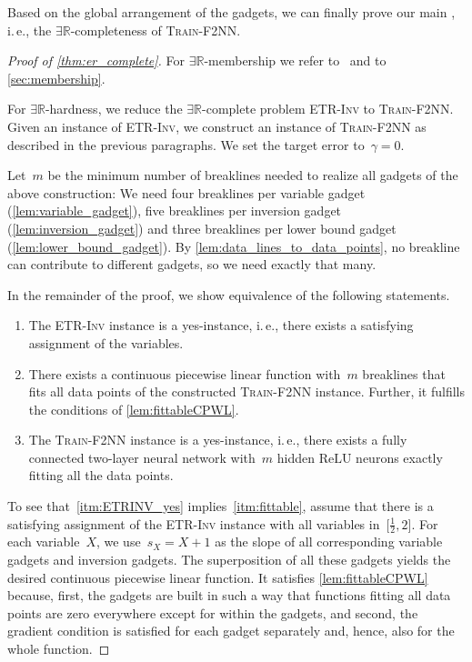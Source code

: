\documentclass[11pt]{article}
\numberwithin{equation}{section}
\theoremstyle{definition}
\theoremstyle{plain}
\newcommand{\R}{\mathbb R}
\newcommand{\ie}{i.\,e.}
\newcommand{\ER}{\texorpdfstring{\ensuremath{\exists\R}}{ER}\xspace}
\newcommand{\problemname}[1]{\textnormal{\textsc{#1}}\xspace}
\newcommand{\trainNN}{\problemname{Train-F2NN}}
\newcommand{\ETRINV}{\problemname{ETR-Inv}}
\newcommand{\fullyconnected}{fully connected\xspace}
\newcommand{\twolayer}{two-layer\xspace}
\newcommand{\ReLU}{\ensuremath{\mathrm{ReLU}}\xspace}
\newcommand{\CPWL}{continuous piecewise linear\xspace}
\theoremstyle{plain}
\begin{document}
Based on the global arrangement of the gadgets, we can finally prove our main , \ie, the \ER-completeness of \trainNN.

\begin{proof}[Proof of \cref{thm:er_complete}]
    For \ER-membership we refer to~\cite{Abrahamsen2021_NeuralNetworks} and to \cref{sec:membership}.
    
    For \ER-hardness, we reduce the \ER-complete problem \ETRINV to \trainNN.
    Given an instance of \ETRINV, we construct an instance of \trainNN as described in the previous paragraphs.
    We set the target error to~$\gamma = 0$.

    Let~$m$ be the minimum number of breaklines needed to realize all gadgets of the above construction:
    We need four breaklines per variable gadget (\cref{lem:variable_gadget}), five breaklines per inversion gadget (\cref{lem:inversion_gadget}) and three breaklines per lower bound gadget (\cref{lem:lower_bound_gadget}).
    By \cref{lem:data_lines_to_data_points}, no breakline can contribute to different gadgets, so we need exactly that many.

    In the remainder of the proof, we show equivalence of the following statements.
    \begin{enumerate}[label=(\arabic*)]
        \item\label{itm:ETRINV_yes}
        The \ETRINV instance is a yes-instance, \ie, there exists a satisfying assignment of the variables.

        \item\label{itm:fittable}
        There exists a \CPWL function with~$m$ breaklines that fits all data points of the constructed \trainNN instance.
        Further, it fulfills the conditions of \cref{lem:fittableCPWL}.

        \item\label{itm:trainNN_yes}
        The \trainNN instance is a yes-instance, \ie, there exists a \fullyconnected \twolayer neural network with~$m$ hidden \ReLU neurons exactly fitting all the data points.
    \end{enumerate}

    To see that~\ref{itm:ETRINV_yes} implies~\ref{itm:fittable}, assume that there is a satisfying assignment of the \ETRINV instance with all variables in~$\bigl[\frac{1}{2}, 2\bigr]$.
    For each variable~$X$, we use~$s_X = X + 1$ as the slope of all corresponding variable gadgets and inversion gadgets.
    The superposition of all these gadgets yields the desired \CPWL function.
    It satisfies \cref{lem:fittableCPWL} because, first, the gadgets are built in such a way that functions fitting all data points are %
zero everywhere except for within the gadgets, and second, the gradient condition is satisfied for each gadget separately and, hence, also for the whole function.


\end{proof}
\end{document}
